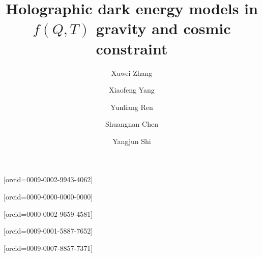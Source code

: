 \documentclass[a4paper,fleqn]{cas-sc}
\begin{document}
\let\WriteBookmarks\relax
\def\floatpagepagefraction{1}
\def\textpagefraction{.001}

\shorttitle{}    

\shortauthors{}  

\title [mode = title]{Holographic dark energy models in {$f(Q,T)$} gravity and cosmic constraint}  



%

\author[1,2]{Xuwei Zhang}[orcid=0009-0002-9943-4062]




\author[1,2]{Xiaofeng Yang}[orcid=0000-0000-0000-0000]
\cormark[1]

\author[1,3]{Yunliang Ren}[orcid=0000-0002-9659-4581]

\author[1,3]{Shuangnan Chen}[orcid=0009-0001-5887-7652]

\author[1,4]{Yangjun Shi}[orcid=0009-0007-8857-7371]
\end{document}
